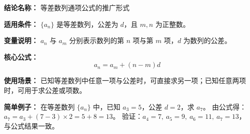 \textbf{结论名称：} 等差数列通项公式的推广形式

\textbf{适用条件：} $\{a_n\}$ 是等差数列，公差为 $d$，且 $m,n$ 为正整数。

\textbf{变量说明：} $a_n$ 与 $a_m$ 分别表示数列的第 $n$ 项与第 $m$ 项，$d$ 为数列的公差。

\textbf{核心公式：} \[ \boxed{a_n = a_m + (n-m)d} \]

\textbf{使用场景：} 已知等差数列中任意一项与公差时，可直接求另一项；已知任意两项时，可用于求公差或项数。

\textbf{简单例子：} 在等差数列 $\{a_n\}$ 中，已知 $a_3=5$，公差 $d=2$，求 $a_7$。  
由公式得：$a_7 = a_3 + (7-3)\times 2 = 5 + 8 = 13$。  
验证：$a_4=7,\ a_5=9,\ a_6=11,\ a_7=13$，与公式结果一致。